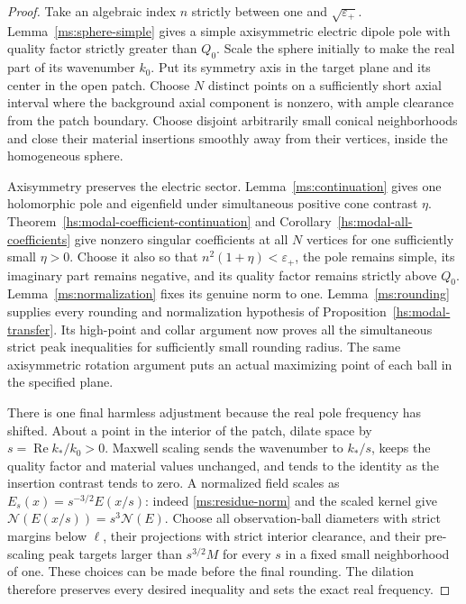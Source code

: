 \begin{proof}
Take an algebraic index $n$ strictly between one and
$\sqrt{\varepsilon_+}$.  Lemma~\ref{ms:sphere-simple} gives a
simple axisymmetric electric dipole pole with quality factor
strictly greater than $Q_0$.  Scale the sphere initially to make
the real part of its wavenumber $k_0$.  Put its symmetry axis in
the target plane and its center in the open patch.  Choose $N$
distinct points on a sufficiently short axial interval where the
background axial component is nonzero, with ample clearance from
the patch boundary.  Choose disjoint arbitrarily small conical
neighborhoods and close their material insertions smoothly away
from their vertices, inside the homogeneous sphere.

Axisymmetry preserves the electric sector.  Lemma~\ref{ms:continuation}
gives one holomorphic pole and eigenfield under simultaneous
positive cone contrast $\eta$.  Theorem~\ref{hs:modal-coefficient-continuation}
and Corollary~\ref{hs:modal-all-coefficients} give nonzero singular
coefficients at all $N$ vertices for one sufficiently small
$\eta>0$.  Choose it also so that $n^2(1+\eta)<\varepsilon_+$,
the pole remains simple, its imaginary part remains negative, and
its quality factor remains strictly above $Q_0$.
Lemma~\ref{ms:normalization} fixes its genuine norm to one.
Lemma~\ref{ms:rounding} supplies every rounding and normalization
hypothesis of Proposition~\ref{hs:modal-transfer}.  Its high-point
and collar argument now proves all the simultaneous strict peak
inequalities for sufficiently small rounding radius.  The same
axisymmetric rotation argument puts an actual maximizing point
of each ball in the specified plane.

There is one final harmless adjustment because the real pole
frequency has shifted.  About a point in the interior of the patch,
dilate space by $s=\operatorname{Re}k_*/k_0>0$.  Maxwell scaling
sends the wavenumber to $k_*/s$, keeps the quality factor and
material values unchanged, and tends to the identity as the
insertion contrast tends to zero.  A normalized field scales as
$E_s(x)=s^{-3/2}E(x/s)$: indeed \eqref{ms:residue-norm} and
the scaled kernel give $\mathcal N(E(x/s))=s^3\mathcal N(E)$.
Choose all observation-ball diameters with strict margins below
$\ell$, their projections with strict interior clearance, and
their pre-scaling peak targets larger than $s^{3/2}M$ for every
$s$ in a fixed small neighborhood of one.  These choices can be
made before the final rounding.  The dilation therefore preserves
every desired inequality and sets the exact real frequency.
\end{proof}

